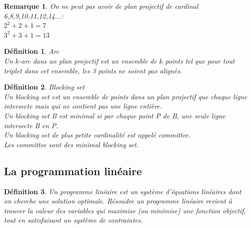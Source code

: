 \documentclass[a4paper]{article}
\newtheorem{Rem}{Remarque}[subsection]
\newtheorem{Def}{Définition}
\begin{document}
\begin{Rem}
On ne peut pas avoir de plan projectif de cardinal 6,8,9,10,11,12,14...: \\
$2^2+2+1=7$ \\
$3^2+3+1=13$
\end{Rem}

\begin{Def}{Arc} \\
  Un $k$-arc dans un plan projectif est un ensemble de $k$ points tel que pour tout triplet dans cet ensemble, les 3 points ne soient pas alignés.
\end{Def}

\begin{Def}{Blocking set}\\
  Un \textit{blocking set} est un ensemble de points dans un plan projectif que chaque ligne intersecte mais qui ne contient pas une ligne entière.\\
  Un \textit{blocking set} B est minimal si par chaque point P de B, une seule ligne intersecte B en P.\\
  Un \textit{blocking set} de plus petite cardinalité est appelé \textit{committee}.\\
  Les \textit{committee} sont des \textit{minimal blocking set}.
\end{Def}

\newpage
\subsection{La programmation linéaire}
\begin{Def}
  Un programme linéaire est un système d’équations linéaires dont on cherche une solution optimale. Résoudre un programme linéaire revient à trouver la valeur des variables qui maximise (ou minimise) une fonction objectif, tout en satisfaisant un système de contraintes.
\end{Def}
\end{document}
